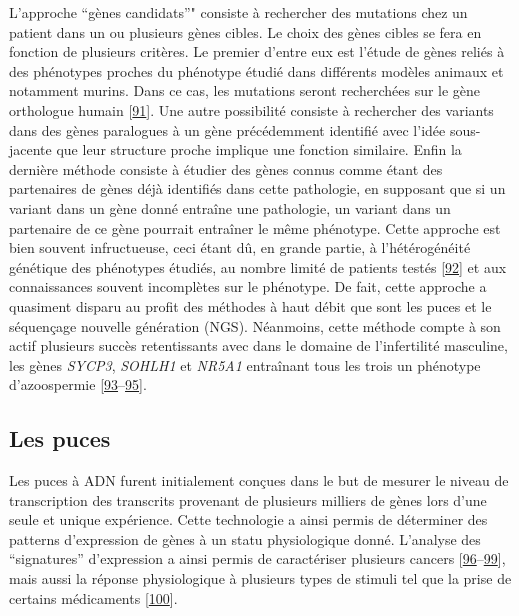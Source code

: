 \documentclass[12pt,a4paper,twoside]{ugathesis}
\theoremstyle{definition}
\theoremstyle{definition}
\theoremstyle{definition}
\theoremstyle{remark}
\begin{document}
L'approche ``gènes candidats''" consiste à rechercher des mutations chez
un patient dans un ou plusieurs gènes cibles. Le choix des gènes cibles
se fera en fonction de plusieurs critères. Le premier d'entre eux est
l'étude de gènes reliés à des phénotypes proches du phénotype étudié
dans différents modèles animaux et notamment murins. Dans ce cas, les
mutations seront recherchées sur le gène orthologue humain
{[}\protect\hyperlink{ref-DeBoer2015}{91}{]}. Une autre possibilité
consiste à rechercher des variants dans des gènes paralogues à un gène
précédemment identifié avec l'idée sous-jacente que leur structure
proche implique une fonction similaire. Enfin la dernière méthode
consiste à étudier des gènes connus comme étant des partenaires de gènes
déjà identifiés dans cette pathologie, en supposant que si un variant
dans un gène donné entraîne une pathologie, un variant dans un
partenaire de ce gène pourrait entraîner le même phénotype. Cette
approche est bien souvent infructueuse, ceci étant dû, en grande partie,
à l'hétérogénéité génétique des phénotypes étudiés, au nombre limité de
patients testés {[}\protect\hyperlink{ref-ElInati2012}{92}{]} et aux
connaissances souvent incomplètes sur le phénotype. De fait, cette
approche a quasiment disparu au profit des méthodes à haut débit que
sont les puces et le séquençage nouvelle génération (NGS). Néanmoins,
cette méthode compte à son actif plusieurs succès retentissants avec
dans le domaine de l'infertilité masculine, les gènes \emph{SYCP3},
\emph{SOHLH1} et \emph{NR5A1} entraînant tous les trois un phénotype
d'azoospermie
{[}\protect\hyperlink{ref-Miyamoto2003}{93}--\protect\hyperlink{ref-Bashamboo2010}{95}{]}.

\newpage

\subsection{Les puces}\label{les-puces}

Les puces à ADN furent initialement conçues dans le but de mesurer le
niveau de transcription des transcrits provenant de plusieurs milliers
de gènes lors d'une seule et unique expérience. Cette technologie a
ainsi permis de déterminer des patterns d'expression de gènes à un statu
physiologique donné. L'analyse des ``signatures'' d'expression a ainsi
permis de caractériser plusieurs cancers
{[}\protect\hyperlink{ref-Alon1999}{96}--\protect\hyperlink{ref-VantVeer2002}{99}{]},
mais aussi la réponse physiologique à plusieurs types de stimuli tel que
la prise de certains médicaments
{[}\protect\hyperlink{ref-Brachat2002}{100}{]}.
\end{document}
